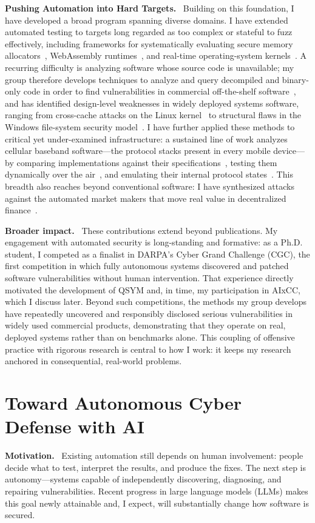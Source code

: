 \documentclass[10pt,letterpaper]{article}
\newcommand{\PP}[1]{\par\smallskip\noindent\textbf{#1.}\ }
\begin{document}
\PP{Pushing Automation into Hard Targets} Building on this foundation, I have
developed a broad program spanning diverse domains. I have extended automated
testing to targets long regarded as too complex or stateful to fuzz effectively,
including frameworks for systematically evaluating secure memory
allocators~\cite{yun:hardsheap}, WebAssembly runtimes~\cite{park:rgfuzz}, and
real-time operating-system kernels~\cite{lee:rtcon}. A recurring difficulty is
analyzing software whose source code is unavailable; my group therefore develops
techniques to analyze and query decompiled and binary-only code in order to find
vulnerabilities in commercial off-the-shelf software~\cite{han:queryx}, and has
identified design-level weaknesses in widely deployed systems software, ranging
from cross-cache attacks on the Linux kernel~\cite{kim:crossx} to structural
flaws in the Windows file-system security model~\cite{kim:jenga}. I have further
applied these methods to critical yet under-examined infrastructure: a sustained
line of work analyzes cellular baseband software---the protocol stacks present in
every mobile device---by comparing implementations against their
specifications~\cite{kim:basespec,kim:basecomp}, testing them dynamically over the
air~\cite{park:doltest,hoang:llfuzz,park:otabase}, and emulating their internal
protocol states~\cite{jeong:firmstate}. This breadth also reaches beyond
conventional software: I have synthesized attacks against the automated market
makers that move real value in decentralized finance~\cite{han:cpmm}.

\PP{Broader impact} These contributions extend beyond publications. My engagement
with automated security is long-standing and formative: as a Ph.D. student, I
competed as a finalist in DARPA's Cyber Grand Challenge (CGC), the first competition in
which fully autonomous systems discovered and patched software vulnerabilities
without human intervention. That experience directly motivated the development of
QSYM and, in time, my participation in AIxCC, which I discuss later. Beyond such
competitions, the methods my group develops have repeatedly uncovered and
responsibly disclosed serious vulnerabilities in widely used commercial products,
demonstrating that they operate on real, deployed systems rather than on
benchmarks alone. This coupling of offensive practice with rigorous research is
central to how I work: it keeps my research anchored in consequential, real-world
problems.

\section{Toward Autonomous Cyber Defense with AI}
\PP{Motivation} Existing automation still depends on human involvement: people
decide what to test, interpret the results, and produce the fixes. The next step
is autonomy---systems capable of independently discovering, diagnosing, and
repairing vulnerabilities. Recent progress in large language models (LLMs) makes
this goal newly attainable and, I expect, will substantially change how software
is secured.
\end{document}
